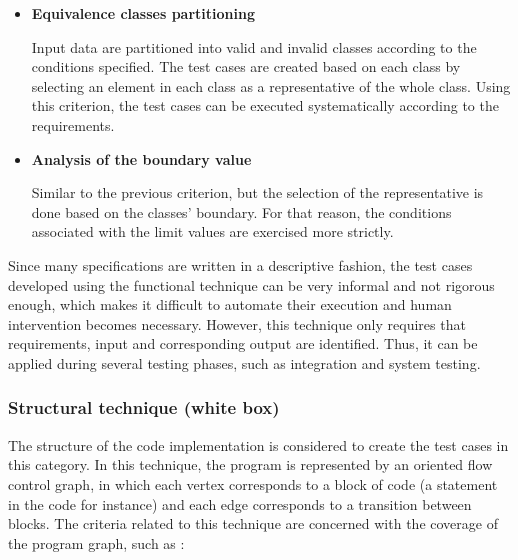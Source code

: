 	\begin{itemize}
	\item \textbf{Equivalence classes partitioning}
	
	Input data are partitioned into valid and invalid classes according to the conditions specified. The test cases are created based on each class by selecting an element in each class as a representative of the whole class. Using this criterion, the test cases can be executed systematically according to the requirements.

	\item \textbf{Analysis of the boundary value}
	
	Similar to the previous criterion, but the selection of the representative is done based on the classes' boundary. For that reason, the conditions associated with the limit values are exercised more strictly.

	\end{itemize}

Since many specifications are written in a descriptive fashion, the test cases developed using the functional technique can be very informal and not rigorous enough, which makes it difficult to automate their execution and human intervention becomes necessary. However, this technique only requires that requirements, input and corresponding output are identified. Thus, it can be applied during several testing phases, such as integration and system testing.

\subsubsection{Structural technique (white box)}
\label{strucTest}

The structure of the code implementation is considered to create the test cases in this category. In this technique, the program is represented by an oriented flow control graph, in which each vertex corresponds to a block of code (a statement in the code for instance) and each edge corresponds to a transition between blocks. The criteria related to this technique are concerned with the coverage of the program graph, such as \cite{Ammann:08}:

